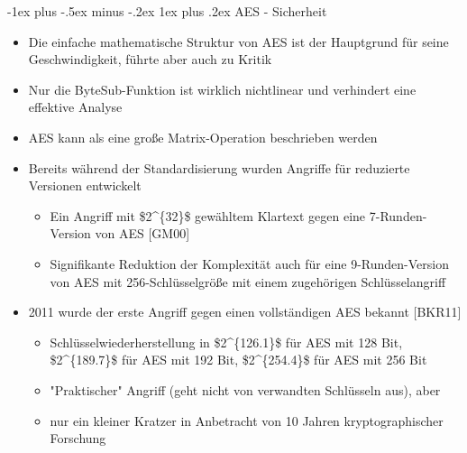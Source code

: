 \documentclass[a4paper]{article}
\makeatletter
\renewcommand{\subsubsection}{\@startsection{subsubsection}{3}{0mm}%
 {-1ex plus -.5ex minus -.2ex}%
 {1ex plus .2ex}%
 {\normalfont\small\bfseries}}
\makeatother
\begin{document}
\begin{multicols}{3}
    \subsubsection{AES - Sicherheit}

    \begin{itemize}
        \item
              Die einfache mathematische Struktur von AES ist der Hauptgrund für
              seine Geschwindigkeit, führte aber auch zu Kritik
        \item
              Nur die ByteSub-Funktion ist wirklich nichtlinear und verhindert eine
              effektive Analyse
        \item
              AES kann als eine große Matrix-Operation beschrieben werden
        \item
              Bereits während der Standardisierung wurden Angriffe für reduzierte
              Versionen entwickelt

              \begin{itemize}
                  \item
                        Ein Angriff mit \$2\^{}\{32\}\$ gewähltem Klartext gegen eine
                        7-Runden-Version von AES {[}GM00{]}
                  \item
                        Signifikante Reduktion der Komplexität auch für eine
                        9-Runden-Version von AES mit 256-Schlüsselgröße mit einem
                        zugehörigen Schlüsselangriff
              \end{itemize}
        \item
              2011 wurde der erste Angriff gegen einen vollständigen AES bekannt
              {[}BKR11{]}

              \begin{itemize}
                  \item
                        Schlüsselwiederherstellung in \$2\^{}\{126.1\}\$ für AES mit 128
                        Bit, \$2\^{}\{189.7\}\$ für AES mit 192 Bit, \$2\^{}\{254.4\}\$ für
                        AES mit 256 Bit
                  \item
                        "Praktischer" Angriff (geht nicht von verwandten Schlüsseln aus),
                        aber
                  \item
                        nur ein kleiner Kratzer in Anbetracht von 10 Jahren
                        kryptographischer Forschung
              \end{itemize}
    \end{itemize}



\end{multicols}
\end{document}
